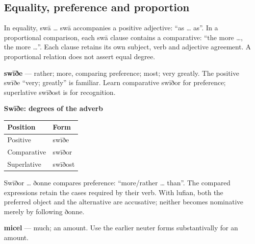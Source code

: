 \subsection*{Equality, preference and proportion}

In equality, swā … swā accompanies a positive adjective: “as … as”. In a proportional comparison, each swā clause contains a comparative: “the more …, the more …”. Each clause retains its own subject, verb and adjective agreement. A proportional relation does not assert equal degree.

\textbf{swīðe} — rather; more, comparing preference; most; very greatly. The positive swīðe “very; greatly” is familiar. Learn comparative swīðor for preference; superlative swīðost is for recognition.

\textbf{Swīðe: degrees of the adverb}

\par\begingroup
\fontsize{10.5}{13.2}\selectfont
\setlength{\LTleft}{0pt}\setlength{\LTright}{\fill}
\noindent
\begin{tabular}{@{}>{\raggedright\arraybackslash}p{63.48mm}>{\raggedright\arraybackslash}p{57.71mm}@{}}
\toprule
\textbf{Position} & \textbf{Form} \\
\midrule
Positive & swīðe \\
Comparative & swīðor \\
Superlative & swīðost \\
\bottomrule
\end{tabular}
\par\endgroup

Swīðor … ðonne compares preference: “more/\allowbreak{}rather … than”. The compared expressions retain the cases required by their verb. With lufian, both the preferred object and the alternative are accusative; neither becomes nominative merely by following ðonne.

\textbf{micel} — much; an amount. Use the earlier neuter forms substantivally for an amount.

